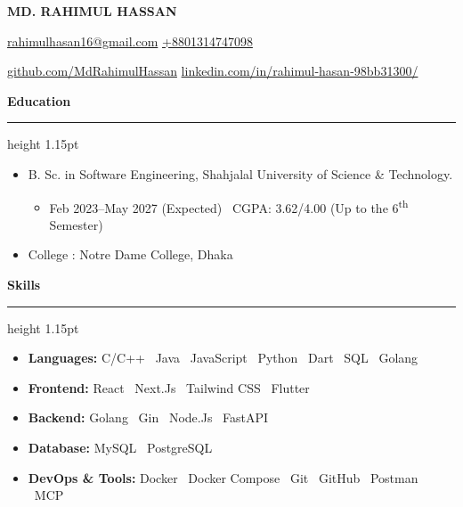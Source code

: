 \documentclass[11pt,a4paper]{article}
\newcommand{\resumesection}[1]{%
  \vspace{4.5pt}%
  {\fontsize{13}{14}\selectfont\bfseries\color{techBlue}#1}\par
  \vspace{6.5pt}\nointerlineskip
  {\color{techBlue}\hrule height 1.15pt}%
  \vspace{4.5pt}
}
\newenvironment{resumelist}{%
  \begin{itemize}[leftmargin=18pt,label=\textbullet,itemsep=0.9pt,topsep=0pt,
    parsep=0pt,partopsep=0pt]
}{\end{itemize}}
\begin{document}
\begin{center}
  {\fontsize{28}{31}\selectfont\bfseries MD. RAHIMUL HASSAN}\par
  \vspace{4pt}
  {\fontsize{11}{12}\selectfont
    {\color{techBlue}\faEnvelope}\enspace\href{mailto:rahimulhasan16@gmail.com}{\color{black}rahimulhasan16@gmail.com}
    \hspace{1.25em}
    {\color{techBlue}\faPhone}\enspace\href{tel:+8801314747098}{\color{black}+8801314747098}\par
    \vspace{2.5pt}
    {\color{techBlue}\faGithub}\enspace\href{https://github.com/MdRahimulHassan}{\color{black}github.com/MdRahimulHassan}
    \hspace{1.25em}
    {\color{techBlue}\faLinkedin}\enspace\href{https://linkedin.com/in/rahimul-hasan-98bb31300/}{\color{black}linkedin.com/in/rahimul-hasan-98bb31300/}
  }
\end{center}
\vspace{4pt}

\resumesection{Education}
\begin{resumelist}
  \item B. Sc. in Software Engineering, Shahjalal University of Science \& Technology.
    \begin{resumelist}
      \item Feb 2023--May 2027 (Expected) \textbullet\ CGPA: 3.62/4.00 (Up to the 6\textsuperscript{th} Semester)
    \end{resumelist}
  \item College : Notre Dame College, Dhaka
\end{resumelist}

\resumesection{Skills}
\begin{resumelist}
  \item \textbf{Languages:} C/C++ \textbullet\ Java \textbullet\ JavaScript \textbullet\ Python \textbullet\ Dart \textbullet\ SQL \textbullet\ Golang
  \item \textbf{Frontend:} React \textbullet\ Next.Js \textbullet\ Tailwind CSS \textbullet\ Flutter
  \item \textbf{Backend:} Golang \textbullet\ Gin \textbullet\ Node.Js \textbullet\ FastAPI
  \item \textbf{Database:} MySQL \textbullet\ PostgreSQL
  \item \textbf{DevOps \& Tools:} Docker \textbullet\ Docker Compose \textbullet\ Git \textbullet\ GitHub \textbullet\ Postman \textbullet\ MCP
\end{resumelist}
\end{document}
